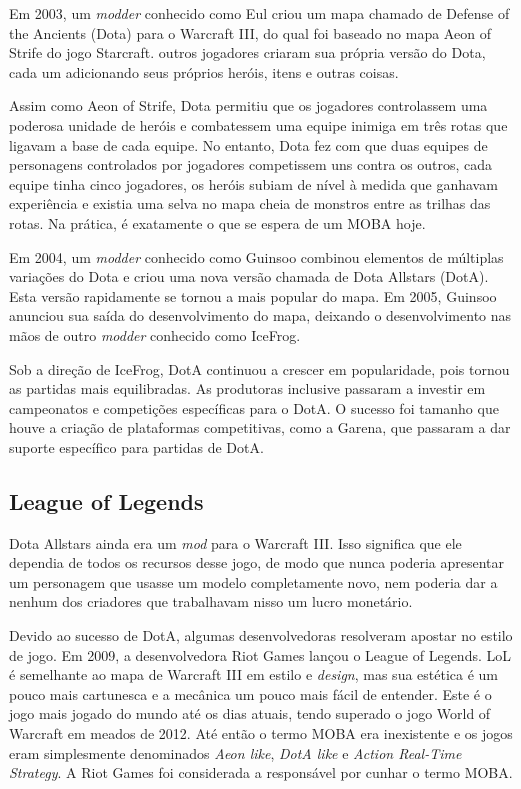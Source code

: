 Em 2003, um \textit{modder} conhecido como Eul criou um mapa chamado de Defense of the Ancients (Dota) para o Warcraft III, do qual foi baseado no mapa Aeon of Strife do jogo Starcraft.  outros jogadores criaram sua própria versão do Dota, cada um adicionando seus próprios heróis, itens e outras coisas.

Assim como Aeon of Strife, Dota permitiu que os jogadores controlassem uma poderosa unidade de heróis e combatessem uma equipe inimiga em três rotas que ligavam a base de cada equipe. No entanto, Dota fez com que duas equipes de personagens controlados por jogadores competissem uns contra os outros, cada equipe tinha cinco jogadores, os heróis subiam de nível à medida que ganhavam experiência e existia uma selva no mapa cheia de monstros entre as trilhas das rotas. Na prática, é exatamente o que se espera de um MOBA hoje.

Em 2004, um \textit{modder} conhecido como Guinsoo combinou elementos de múltiplas variações do Dota e criou uma nova versão chamada de Dota Allstars (DotA). Esta versão rapidamente se tornou a mais popular do mapa. Em 2005, Guinsoo anunciou sua saída do desenvolvimento do mapa, deixando o desenvolvimento nas mãos de outro \textit{modder} conhecido como IceFrog.

Sob a direção de IceFrog, DotA continuou a crescer em popularidade, pois tornou as partidas mais equilibradas. As produtoras inclusive passaram a investir em campeonatos e competições específicas para o DotA. O sucesso foi tamanho que houve a criação de plataformas competitivas, como a Garena, que passaram a dar suporte específico para partidas de DotA.

\subsection{League of Legends}
Dota Allstars ainda era um \textit{mod} para o Warcraft III. Isso significa que ele dependia de todos os recursos desse jogo, de modo que nunca poderia apresentar um personagem que usasse um modelo completamente novo, nem poderia dar a nenhum dos criadores que trabalhavam nisso um lucro monetário.

Devido ao sucesso de DotA, algumas desenvolvedoras resolveram apostar no estilo de jogo. Em 2009, a desenvolvedora Riot Games lançou o League of Legends. LoL é semelhante ao mapa de Warcraft III em estilo e \textit{design}, mas sua estética é um pouco mais cartunesca e a mecânica um pouco mais fácil de entender. Este é o jogo mais jogado do mundo até os dias atuais, tendo superado o jogo World of Warcraft em meados de 2012. Até então o termo MOBA era inexistente e os jogos eram simplesmente denominados \textit{Aeon like}, \textit{DotA like} e \textit{Action Real-Time Strategy}. A Riot Games foi considerada a responsável por cunhar o termo MOBA.

